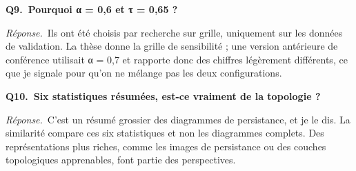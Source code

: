 \documentclass[11pt,a4paper]{article}
\begin{document}
\textbf{Q9.~Pourquoi α = 0,6 et τ = 0,65 ?}\par\nopagebreak
\textit{Réponse.}~Ils ont été choisis par recherche sur grille, uniquement sur les données de validation. La thèse donne la grille de sensibilité ; une version antérieure de conférence utilisait α = 0,7 et rapporte donc des chiffres légèrement différents, ce que je signale pour qu'on ne mélange pas les deux configurations.\par\medskip
\textbf{Q10.~Six statistiques résumées, est-ce vraiment de la topologie ?}\par\nopagebreak
\textit{Réponse.}~C'est un résumé grossier des diagrammes de persistance, et je le dis. La similarité compare ces six statistiques et non les diagrammes complets. Des représentations plus riches, comme les images de persistance ou des couches topologiques apprenables, font partie des perspectives.\par\medskip
\end{document}
